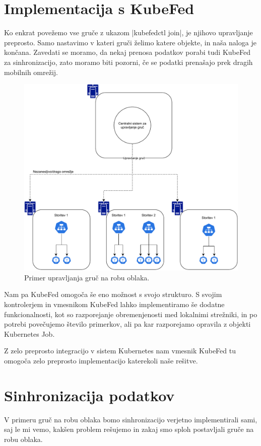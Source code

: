 \documentclass[a4paper, 12pt]{book}
\begin{document}
\section{Implementacija s KubeFed}
Ko enkrat povežemo vse gruče z ukazom \spverb|kubefedctl join|, je njihovo upravljanje preprosto.
Samo nastavimo v kateri gruči želimo katere objekte, in naša naloga je končana.
Zavedati se moramo, da nekaj prenosa podatkov porabi tudi KubeFed za sinhronizacijo, zato moramo biti pozorni, če se podatki prenašajo prek dragih mobilnih omrežij.
\begin{figure}[h]
\begin{center}
\includegraphics[width=1.0\textwidth]{images/upravljanje-robnih-gruc.pdf}
\end{center}
\caption{Primer upravljanja gruč na robu oblaka.}
\label{problem-prevelike-latence}
\end{figure}

Nam pa KubeFed omogoča še eno možnost s svojo strukturo.
S svojim kontrolerjem in vmesnikom KubeFed lahko implementiramo še dodatne funkcionalnosti, kot so razporejanje obremenjenosti med lokalnimi strežniki, in po potrebi povečujemo število primerkov, ali pa kar razporejamo opravila z objekti Kubernetes Job.

Z zelo preprosto integracijo v sistem Kubernetes nam vmesnik KubeFed tu omogoča zelo preprosto implementacijo katerekoli naše rešitve.
\section{Sinhronizacija podatkov}
V primeru gruč na robu oblaka bomo sinhronizacijo verjetno implementirali sami, saj le mi vemo, kakšen problem rešujemo in zakaj smo sploh postavljali gruče na robu oblaka.
\end{document}
